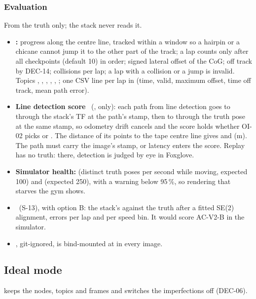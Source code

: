 \documentclass[11pt,a4paper]{article}
\newcommand{\planned}{\target{Planned}}
\newcommand{\deferred}{\target{Deferred}}
\begin{document}
\subsubsection{Evaluation}\label{sec:eval}
From the truth only; the stack never reads it.
\begin{itemize}
  \item \textbf{:} progress along the centre line, tracked within a window so a hairpin or a chicane cannot jump it to the other part of the track; a lap counts only after all checkpoints (default 10) in order; signed lateral offset of the CoG; off track by DEC-14; collisions per lap; a lap with a collision or a jump is invalid. Topics  , , , , , ; one CSV line per lap in  (time, valid, maximum offset, time off track, mean path error).
  \item \textbf{Line detection score} \planned\ (,  only): each path from line detection goes to  through the stack's TF at the path's stamp, then to  through the truth pose at the same stamp, so odometry drift cancels and the score holds whether OI-02 picks  or . The distance of its points to the tape centre line gives  and  (m). The path must carry the image's stamp, or latency enters the score. Replay has no truth: there, detection is judged by eye in Foxglove.
  \item \textbf{Simulator health:}  (distinct truth poses per second while moving, expected 100) and  (expected 250), with a warning below 95\,\%, so rendering that starves the gym shows.
  \item \textbf{} \deferred\ (S-13), with option B: the stack's \arrowto{} against the truth after a fitted SE(2) alignment, errors per lap and per speed bin. It would score AC-V2-B in the simulator.
  \item {}, git-ignored, is bind-mounted at  in every image.
\end{itemize}

\subsection{Ideal mode}
 keeps the nodes, topics and frames and switches the imperfections off (DEC-06).
\end{document}
